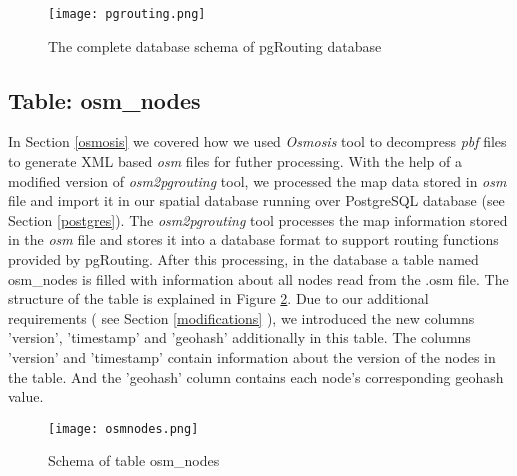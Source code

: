 \begin{figure}
\texttt{[image: pgrouting.png]}
\caption{The complete database schema of pgRouting database}
\label{fg:db}
\end{figure}



\subsection{Table: osm{\_}nodes}
In Section \ref{osmosis} we covered how we used \textit{Osmosis} tool to decompress \textit{pbf} files to generate XML based \textit{osm} files for futher processing. With the help of a modified version of \textit{osm2pgrouting} tool, we processed the map data stored in \textit{osm} file and import it in our spatial database running over PostgreSQL database (see Section \ref{postgres}). The \textit{osm2pgrouting} tool processes the map information stored in the \textit{osm} file and stores it into a database format to support routing functions provided by pgRouting. After this processing, in the database a table named osm{\_}nodes is filled with information about all nodes read from the .osm file. The structure of the table is explained in Figure \ref{fg:osmnodes}. Due to our additional requirements ( see Section \ref{modifications} ), we introduced the new columns 'version', 'timestamp' and 'geohash' additionally in this table. The columns 'version' and 'timestamp' contain information about the version of the nodes in the table. And the 'geohash' column contains each node's corresponding geohash value. 
\begin{figure}
\texttt{[image: osmnodes.png]}
\caption{Schema of table osm{\_}nodes}
\label{fg:osmnodes}
\end{figure}

